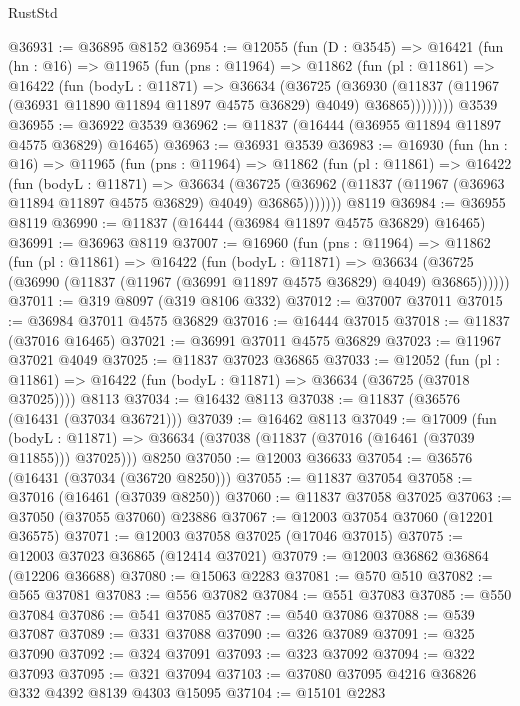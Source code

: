 \begin{lexlean}{RustStd}
\begin{coremodule}
{\begin{coremodule}
{{{{{{{{{{{{{{{{{{{{{{{{{{{{{{{{{{{{{{{{{{{{{{{{{{@36931 := @36895 @8152
@36954 := @12055
    (fun (D : @3545) =>
    @16421
      (fun (hn : @16) =>
      @11965
        (fun (pns : @11964) =>
        @11862
          (fun (pl : @11861) =>
          @16422
            (fun (bodyL : @11871) =>
            @36634
              (@36725
                (@36930
                  (@11837 (@11967 (@36931 @11890 @11894 @11897 @4575 @36829) @4049) @36865))))))))
    @3539
@36955 := @36922 @3539
@36962 := @11837 (@16444 (@36955 @11894 @11897 @4575 @36829) @16465)
@36963 := @36931 @3539
@36983 := @16930
    (fun (hn : @16) =>
    @11965
      (fun (pns : @11964) =>
      @11862
        (fun (pl : @11861) =>
        @16422
          (fun (bodyL : @11871) =>
          @36634
            (@36725 (@36962 (@11837 (@11967 (@36963 @11894 @11897 @4575 @36829) @4049) @36865)))))))
    @8119
@36984 := @36955 @8119
@36990 := @11837 (@16444 (@36984 @11897 @4575 @36829) @16465)
@36991 := @36963 @8119
@37007 := @16960
    (fun (pns : @11964) =>
    @11862
      (fun (pl : @11861) =>
      @16422
        (fun (bodyL : @11871) =>
        @36634 (@36725 (@36990 (@11837 (@11967 (@36991 @11897 @4575 @36829) @4049) @36865))))))
@37011 := @319 @8097 (@319 @8106 @332)
@37012 := @37007 @37011
@37015 := @36984 @37011 @4575 @36829
@37016 := @16444 @37015
@37018 := @11837 (@37016 @16465)
@37021 := @36991 @37011 @4575 @36829
@37023 := @11967 @37021 @4049
@37025 := @11837 @37023 @36865
@37033 := @12052
    (fun (pl : @11861) => @16422 (fun (bodyL : @11871) => @36634 (@36725 (@37018 @37025))))
    @8113
@37034 := @16432 @8113
@37038 := @11837 (@36576 (@16431 (@37034 @36721)))
@37039 := @16462 @8113
@37049 := @17009
    (fun (bodyL : @11871) => @36634 (@37038 (@11837 (@37016 (@16461 (@37039 @11855))) @37025)))
    @8250
@37050 := @12003 @36633
@37054 := @36576 (@16431 (@37034 (@36720 @8250)))
@37055 := @11837 @37054
@37058 := @37016 (@16461 (@37039 @8250))
@37060 := @11837 @37058 @37025
@37063 := @37050 (@37055 @37060) @23886
@37067 := @12003 @37054 @37060 (@12201 @36575)
@37071 := @12003 @37058 @37025 (@17046 @37015)
@37075 := @12003 @37023 @36865 (@12414 @37021)
@37079 := @12003 @36862 @36864 (@12206 @36688)
@37080 := @15063 @2283
@37081 := @570 @510
@37082 := @565 @37081
@37083 := @556 @37082
@37084 := @551 @37083
@37085 := @550 @37084
@37086 := @541 @37085
@37087 := @540 @37086
@37088 := @539 @37087
@37089 := @331 @37088
@37090 := @326 @37089
@37091 := @325 @37090
@37092 := @324 @37091
@37093 := @323 @37092
@37094 := @322 @37093
@37095 := @321 @37094
@37103 := @37080 @37095 @4216 @36826 @332 @4392 @8139 @4303 @15095
@37104 := @15101 @2283
}}}}}}}}}}}}}}}}}}}}}}}}}}}}}}}}}}}}}}}}}}}}}}}}}}
\end{coremodule}}
\end{coremodule}
\end{lexlean}
